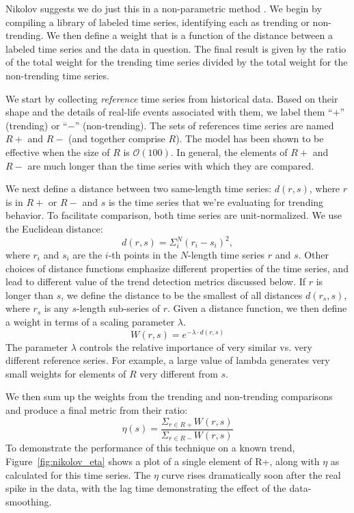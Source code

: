 \documentclass{article}
\begin{document}
Nikolov suggests we do just this in a non-parametric method \cite{Nikolov:2011}. We
begin by compiling a library of labeled time series, identifying each as
trending or non-trending. We then define a weight that is a function of the
distance between a labeled time series and the data in question. The final
result is given by the ratio of the total weight for the trending time series
divided by the total weight for the non-trending time series. 

We start by collecting \textit{reference} time series from historical data. Based on their
shape and the details of real-life events associated with them, we label
them “$+$” (trending) or “$-$” (non-trending). The sets of references time
series are named $R+$ and $R-$ (and together comprise $R$). 
The model has been shown to be effective when the size of $R$ is $\mathcal{O}(100)$. 
In general, the elements of $R+$ and $R-$ are much 
longer than the time series with which they are compared. 

We next define a distance between two same-length time series: $d(r,s)$,
where $r$ is in $R+$ or $R-$ and $s$ is the time series that we’re evaluating for
trending behavior. To facilitate comparison, both time series are unit-normalized. 
We use the Euclidean distance:
\begin{equation}
    d(r,s) = \Sigma_i^N(r_i - s_i)^2,
\end{equation}
where $r_i$ and $s_i$ are the $i$-th points in the $N$-length time series $r$ and $s$. Other
choices of distance functions emphasize different properties of the
time series, and lead to different value of the trend detection metrics
discussed below. If $r$ is longer than $s$, we define the distance to be the
smallest of all distances $d(r_s,s)$, where $r_s$ is any $s$-length sub-series of $r$. Given
a distance function, we then define a weight in terms of a scaling
parameter $\lambda$. 
\begin{equation}
    W(r,s) = e^{-\lambda\cdot d(r,s)}
\end{equation}
The parameter $\lambda$ controls the relative importance of very similar vs. very
different reference series. For example, a large value of lambda generates very
small weights for elements of $R$ very different from $s$. 

We then sum up the weights from the trending and non-trending comparisons and
produce a final metric from their ratio:
\begin{equation}
    \eta(s) = \frac{\Sigma_{r\in R+}W(r,s)}{\Sigma_{r\in R-}W(r,s)} 
\end{equation}
To demonstrate the performance of this technique on a known trend,
Figure~\ref{fig:nikolov_eta} shows a plot of a single element of R+, 
along with $\eta$ as calculated for this time series.
The $\eta$ curve rises dramatically soon after the real spike in the
data, with the lag time demonstrating the effect of the data-smoothing.
\end{document}
